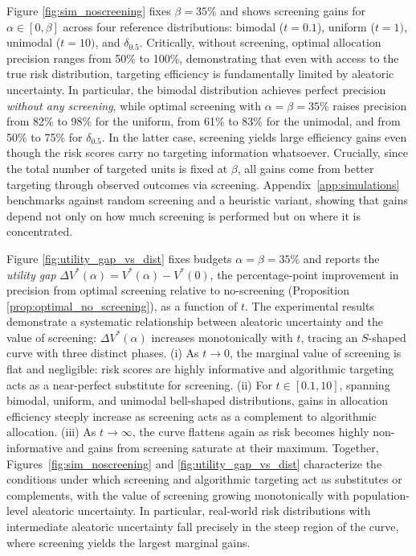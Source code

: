 Figure \ref{fig:sim_noscreening} fixes $\beta = 35\%$ and shows screening gains for $\alpha \in [0, \beta]$ across four reference distributions: bimodal ($t=0.1$), uniform ($t=1)$, unimodal ($t=10)$, and $\delta_{0.5}$. Critically, without screening, optimal allocation precision ranges from 50\% to 100\%, demonstrating that even with access to the true risk distribution, targeting efficiency is fundamentally limited by aleatoric uncertainty. In particular, the bimodal distribution achieves perfect precision \emph{without any screening}, while optimal screening with $\alpha = \beta = 35\%$ raises precision from 82\% to 98\% for the uniform, from 61\% to 83\% for the unimodal, and from 50\% to 75\% for $\delta_{0.5}$. In the latter case, screening yields large efficiency gains even though the risk scores carry no targeting information whatsoever. 
Crucially, since the total number of targeted units is fixed at $\beta$, all gains come from better targeting through observed outcomes via screening. Appendix~\ref{app:simulations} benchmarks against random screening and a heuristic variant, showing that gains depend not only on how much screening is performed but on where it is concentrated.


Figure \ref{fig:utility_gap_vs_dist} fixes budgets $\alpha = \beta = 35\%$ and reports the \textit{utility gap} $\Delta V^*(\alpha) = V^*(\alpha) - V^*(0)$, the percentage-point improvement in precision from optimal screening relative to no-screening (Proposition \ref{prop:optimal_no_screening}), as a function of $t$. The experimental results demonstrate a systematic relationship between aleatoric uncertainty and the value of screening: $\Delta V^*(\alpha)$ increases monotonically with $t$, tracing an $S$-shaped curve with three distinct phases.
(i) As $t\to 0$, the marginal value of screening is flat and negligible: risk scores are highly informative and algorithmic targeting acts as a near-perfect substitute for screening. 
(ii) For $t \in [0.1, 10]$, spanning bimodal, uniform, and unimodal bell-shaped distributions, gains in allocation efficiency steeply increase as screening acts as a complement to algorithmic allocation.
(iii) As $t \to \infty$, the curve flattens again as risk becomes highly non-informative and gains from screening saturate at their maximum. 
Together, Figures~\ref{fig:sim_noscreening} and \ref{fig:utility_gap_vs_dist} characterize the conditions under which screening and algorithmic targeting act as substitutes or complements, with the value of screening growing monotonically with population-level aleatoric uncertainty.
In particular, real-world risk distributions with intermediate aleatoric uncertainty fall precisely in the steep region of the curve, where screening yields the largest marginal gains. 


